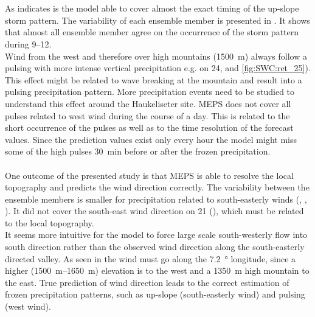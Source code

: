\noindent
\\
\\
As  indicates is the model able to cover almost the exact timing of the up-slope storm pattern. The variability of each ensemble member is presented in . It shows that almost all ensemble member agree on the occurrence of the storm pattern during \SIrange{9}{12}{\UTC}.
\\
Wind from the west and therefore over high mountains (\SI{1500}{\metre}) always follow a pulsing with more intense vertical precipitation e.g. on \SI{24}{\dec},  and \ref{fig:SWC:ret_25}). 
This effect might be related to wave breaking at the mountain and result into a pulsing precipitation pattern. More precipitation events need to be studied to understand this effect around the Haukeliseter site. MEPS does not cover all pulses related to west wind during the course of a day. This is related to the short occurrence of the pulses as well as to the time resolution of the forecast values. Since the prediction values exist only every hour the model might miss some of the high pulses \SI{30}{\minute} before or after the frozen precipitation. 
\\
\\
One outcome of the presented study is that MEPS is able to resolve the local topography and predicts the wind direction correctly. The variability between the ensemble members is smaller for precipitation related to south-easterly winds (, , ). It did not cover the south-east wind direction on \SI{21}{\dec} (), which must be related to the local topography. 
\\
It seems more intuitive for the model to force large scale south-westerly flow into south direction rather than the observed wind direction along the south-easterly directed valley. As seen in  the wind must go along the \SI{7.2}{\degree} longitude, since a higher (\SIrange{1500}{1650}{\metre}) elevation is to the west and a \SI{1350}{\metre} high mountain to the east. True prediction of wind direction leads to the correct estimation of frozen precipitation patterns, such as up-slope (south-easterly wind) and pulsing (west wind). 
\\
\\
